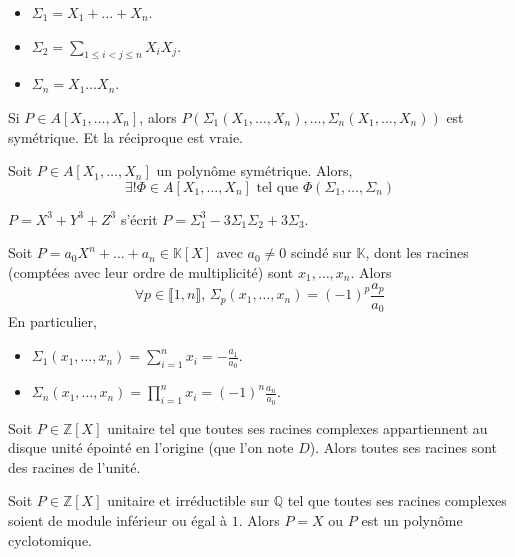 	\begin{example}
		\begin{itemize}
			\item $\Sigma_1 = X_1 + \dots + X_n$.
			\item $\Sigma_2 = \sum_{1 \leq i < j \leq n} X_i X_j$.
			\item $\Sigma_n = X_1 \dots X_n$.
		\end{itemize}
	\end{example}

	\begin{remark}
		Si $P \in A[X_1, \dots, X_n]$, alors $P(\Sigma_1(X_1, \dots, X_n), \dots, \Sigma_n(X_1, \dots, X_n))$ est symétrique. Et la réciproque est vraie.
	\end{remark}

	\begin{theorem}
		Soit $P \in A[X_1, \dots, X_n]$ un polynôme symétrique. Alors,
		\[ \exists! \Phi \in A[X_1, \dots, X_n] \text{ tel que } \Phi(\Sigma_1, \dots, \Sigma_n) \]
	\end{theorem}

	\begin{example}
		$P = X^3 + Y^3 + Z^3$ s'écrit $P = \Sigma_1^3 - 3 \Sigma_1 \Sigma_2 + 3 \Sigma_3$.
	\end{example}


	\begin{application}
		Soit $P = a_0X^n + \dots + a_n \in \mathbb{K}[X]$ avec $a_0 \neq 0$ scindé sur $\mathbb{K}$, dont les racines (comptées avec leur ordre de multiplicité) sont $x_1, \dots, x_n$. Alors
		\[ \forall p \in \llbracket 1, n \rrbracket, \, \Sigma_p(x_1, \dots, x_n) = (-1)^p \frac{a_p}{a_0} \]
		En particulier,
		\begin{itemize}
			\item $\Sigma_1(x_1, \dots, x_n) = \sum_{i=1}^n x_i = -\frac{a_1}{a_0}$.
			\item $\Sigma_n(x_1, \dots, x_n) = \prod_{i=1}^n x_i = (-1)^n \frac{a_n}{a_0}$.
		\end{itemize}
	\end{application}


	\begin{application}
		Soit $P \in \mathbb{Z}[X]$ unitaire tel que toutes ses racines complexes appartiennent au disque unité épointé en l'origine (que l'on note $D$). Alors toutes ses racines sont des racines de l'unité.
	\end{application}

	\begin{corollary}
		Soit $P \in \mathbb{Z}[X]$ unitaire et irréductible sur $\mathbb{Q}$ tel que toutes ses racines complexes soient de module inférieur ou égal à $1$. Alors $P = X$ ou $P$ est un polynôme cyclotomique.
	\end{corollary}

